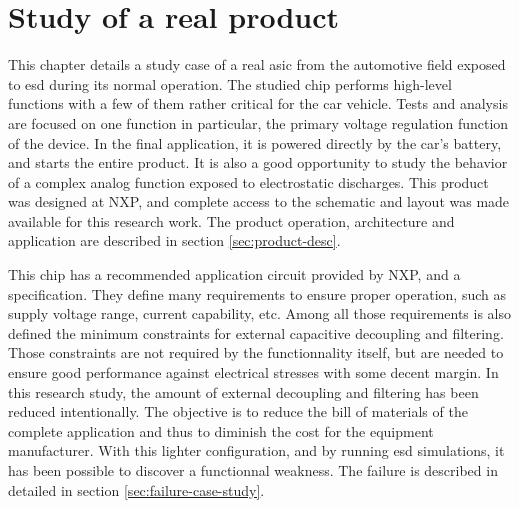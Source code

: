 \section{Study of a real product}
\label{sec:study-real-product}

This chapter details a study case of a real \gls{asic} from the automotive field exposed to \gls{esd} during its normal operation.
The studied chip performs high-level functions with a few of them rather critical for the car vehicle.
Tests and analysis are focused on one function in particular, the primary voltage regulation function of the device.
In the final application, it is powered directly by the car's battery, and starts the entire product.
It is also a good opportunity to study the behavior of a complex analog function exposed to electrostatic discharges.
This product was designed at NXP, and complete access to the schematic and layout was made available for this research work.
The product operation, architecture and application are described in section \ref{sec:product-desc}.

This chip has a recommended application circuit provided by NXP, and a specification.
They define many requirements to ensure proper operation, such as supply voltage range, current capability, etc.
Among all those requirements is also defined the minimum constraints for external capacitive decoupling and filtering.
Those constraints are not required by the functionnality itself, but are needed to ensure good performance against electrical stresses with some decent margin.
In this research study, the amount of external decoupling and filtering has been reduced intentionally.
The objective is to reduce the bill of materials of the complete application and thus to diminish the cost for the equipment manufacturer.
With this lighter configuration, and by running \gls{esd} simulations, it has been possible to discover a functionnal weakness.
The failure is described in detailed in section \ref{sec:failure-case-study}.



